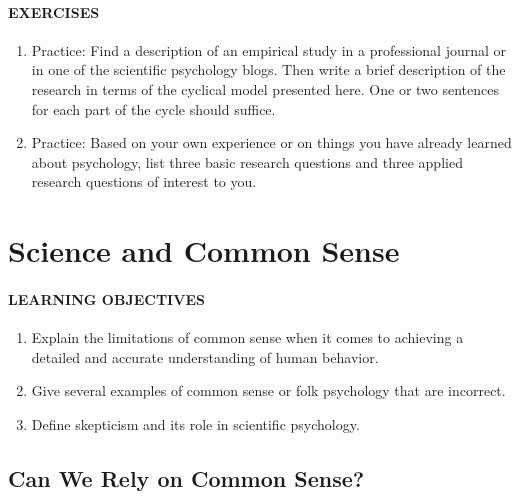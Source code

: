 \documentclass[
]{krantz}
\providecommand{\tightlist}{%
  \setlength{\itemsep}{0pt}\setlength{\parskip}{0pt}}
\begin{document}
\hypertarget{exercises-1}{%
\paragraph*{EXERCISES}\label{exercises-1}}

\begin{enumerate}
\def\labelenumi{\arabic{enumi}.}
\tightlist
\item
  Practice: Find a description of an empirical study in a professional journal or in one of the scientific psychology blogs. Then write a brief description of the research in terms of the cyclical model presented here. One or two sentences for each part of the cycle should suffice.
\item
  Practice: Based on your own experience or on things you have already learned about psychology, list three basic research questions and three applied research questions of interest to you.
\end{enumerate}

\hypertarget{science-and-common-sense}{%
\section{Science and Common Sense}\label{science-and-common-sense}}

\hypertarget{learning-objectives-2}{%
\paragraph*{LEARNING OBJECTIVES}\label{learning-objectives-2}}

\begin{enumerate}
\def\labelenumi{\arabic{enumi}.}
\tightlist
\item
  Explain the limitations of common sense when it comes to achieving a detailed and accurate understanding of human behavior.
\item
  Give several examples of common sense or folk psychology that are incorrect.
\item
  Define skepticism and its role in scientific psychology.
\end{enumerate}

\hypertarget{can-we-rely-on-common-sense}{%
\subsection*{Can We Rely on Common Sense?}\label{can-we-rely-on-common-sense}}
\end{document}
